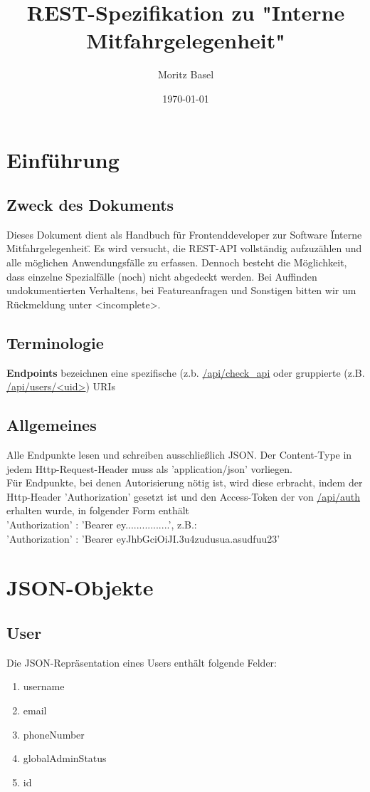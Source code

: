 \documentclass[11pt,a4paper]{article}
\author{Moritz Basel}
\title{REST-Spezifikation zu "Interne Mitfahrgelegenheit"}
\date{\today{}}
\begin{document}
\normalfont
\maketitle{}
\section{Einführung}
\subsection{Zweck des Dokuments}
Dieses Dokument dient als Handbuch für Frontenddeveloper zur Software \"Interne Mitfahrgelegenheit\". Es wird versucht, die REST-API vollständig aufzuzählen und alle möglichen Anwendungsfälle zu erfassen.
Dennoch besteht die Möglichkeit, dass einzelne Spezialfälle (noch) nicht abgedeckt werden. Bei Auffinden undokumentierten Verhaltens, bei Featureanfragen und Sonstigen bitten wir um Rückmeldung unter <incomplete>.
\subsection{Terminologie}
\textbf{Endpoints} bezeichnen eine spezifische (z.b. \url{/api/check_api} oder gruppierte (z.B. \url{/api/users/<uid>}) URIs
\subsection{Allgemeines}
Alle Endpunkte lesen und schreiben ausschließlich JSON. Der Content-Type in jedem Http-Request-Header muss als 'application/json' vorliegen.\\
Für Endpunkte, bei denen Autorisierung nötig ist, wird diese erbracht, indem der Http-Header 'Authorization' gesetzt ist und den Access-Token der von \url{/api/auth} erhalten wurde, in folgender Form enthält\\
'Authorization' : 'Bearer ey................', z.B.:\\
'Authorization' : 'Bearer eyJhbGciOiJI.3u4zudusua.asudfuu23'
\tableofcontents{}
\section{JSON-Objekte}
\subsection{User}
Die JSON-Repräsentation eines Users enthält folgende Felder:
\begin{enumerate}
\item username
\item email
\item phoneNumber
\item globalAdminStatus
\item id
\end{enumerate}
\end{document}
